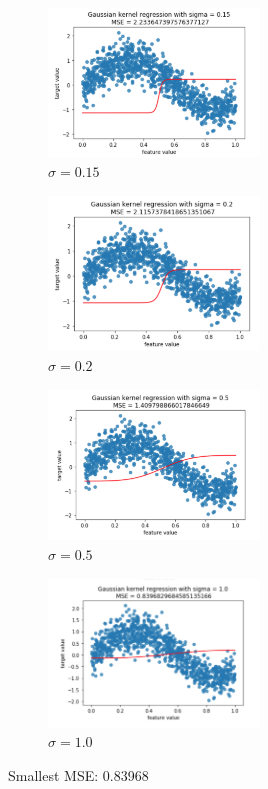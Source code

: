 \begin{enumerate}
\begin{figure}[H]
  \caption{$\sigma = 0.15$}
  \centering
    \includegraphics[width=0.5\textwidth]{images/4.png}
\end{figure}

\begin{figure}[H]
  \caption{$\sigma = 0.2$}
  \centering
    \includegraphics[width=0.5\textwidth]{images/5.png}
\end{figure}

\begin{figure}[H]
  \caption{$\sigma = 0.5$}
  \centering
    \includegraphics[width=0.5\textwidth]{images/6.png}
\end{figure}

\begin{figure}[H]
  \caption{$\sigma = 1.0$}
  \centering
    \includegraphics[width=0.5\textwidth]{images/7.png}
\end{figure}
Smallest MSE: 0.83968


\end{enumerate}

